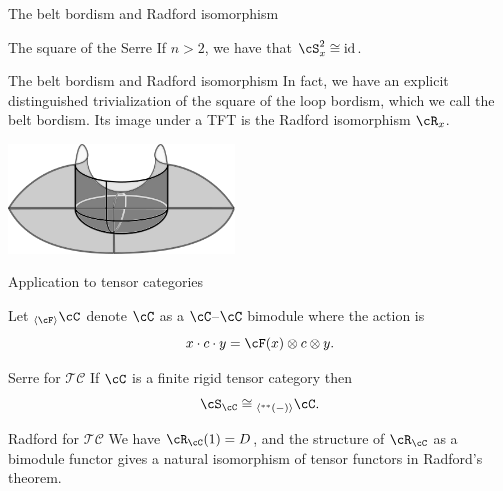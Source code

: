 \documentclass[beamer]{beamer}
\newcommand{\ldd}[1]
{{}^{**}{#1}}
\begin{document}
\begin{frame}{The belt bordism and Radford isomorphism}
\begin{block}{The square of the Serre}
If $n > 2$, we have that $\cS_x^2 \cong \mathrm{id}$.
\end{block}

\begin{block}{The belt bordism and Radford isomorphism}
In fact, we have an explicit distinguished trivialization of the square of the loop bordism, which we call the belt bordism.  Its image under a TFT is the Radford isomorphism $\cR_x$.

\begin{center}
\includegraphics[width=60mm]{../cobordism.png}
\end{center}

\end{block}
\end{frame}

\begin{frame}{Application to tensor categories}
\begin{defn}
Let ${}_{\langle\cF \rangle} \cC$ denote $\cC$ as a $\cC$--$\cC$ bimodule where the action is $$x \cdot c \cdot y = \cF(x) \otimes c \otimes y.$$  
\end{defn}

\begin{block}{Serre for $\mathcal{TC}$}
If $\cC$ is a finite rigid tensor category then $$\cS_\cC \cong {}_{\langle\ldd{(-)}\rangle} \cC.$$
\end{block}

\begin{block}{Radford for $\mathcal{TC}$}
We have $\cR_\cC(1) = D$, and the structure of $\cR_\cC$ as a bimodule functor gives a natural isomorphism of tensor functors in Radford's theorem.
\end{block}
\end{frame}
\end{document}
